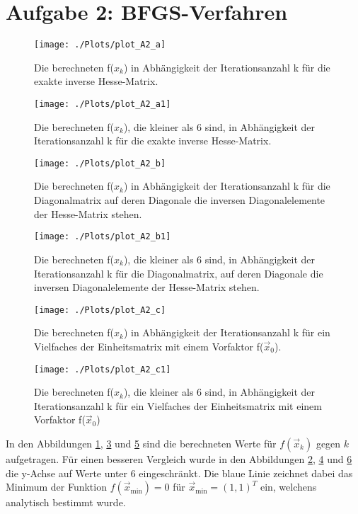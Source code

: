 \section*{Aufgabe 2: BFGS-Verfahren }


  \begin{figure}
    \centering
    \texttt{[image: ./Plots/plot\_A2\_a]}
    \caption{Die berechneten f($x_k$) in Abhängigkeit der Iterationsanzahl k für die  exakte inverse Hesse-Matrix.}
    \label{fig:A2a1}
  \end{figure}
  \begin{figure}
    \centering
    \texttt{[image: ./Plots/plot\_A2\_a1]}
    \caption{Die berechneten f($x_k$), die kleiner als 6 sind, in Abhängigkeit der Iterationsanzahl k für die  exakte inverse Hesse-Matrix.}
    \label{fig:A2a2}
  \end{figure}
  \begin{figure}
    \centering
    \texttt{[image: ./Plots/plot\_A2\_b]}
    \caption{Die berechneten f($x_k$) in Abhängigkeit der Iterationsanzahl k für die Diagonalmatrix auf deren Diagonale die inversen Diagonalelemente der Hesse-Matrix stehen.}
    \label{fig:A2b1}
  \end{figure}
  \begin{figure}
    \centering
    \texttt{[image: ./Plots/plot\_A2\_b1]}
    \caption{Die berechneten f($x_k$), die kleiner als 6 sind, in Abhängigkeit der Iterationsanzahl k für die Diagonalmatrix, auf deren Diagonale die inversen Diagonalelemente der Hesse-Matrix stehen.}
    \label{fig:A2b2}
  \end{figure}
  \begin{figure}
    \centering
    \texttt{[image: ./Plots/plot\_A2\_c]}
    \caption{Die berechneten f($x_k$) in Abhängigkeit der Iterationsanzahl k für ein Vielfaches der Einheitsmatrix mit einem Vorfaktor f($\vec{x}_0$).}
    \label{fig:A2c1}
  \end{figure}
  \begin{figure}
    \centering
    \texttt{[image: ./Plots/plot\_A2\_c1]}
    \caption{Die berechneten f($x_k$), die kleiner als 6 sind, in Abhängigkeit der Iterationsanzahl k für ein Vielfaches der Einheitsmatrix mit einem Vorfaktor f($\vec{x}_0$)}
    \label{fig:A2c2}
  \end{figure}

  In den Abbildungen \ref{fig:A2a1}, \ref{fig:A2b1} und \ref{fig:A2c1} sind die berechneten Werte für $f(\vec{x}_k)$ gegen $k$ aufgetragen. Für einen
  besseren Vergleich wurde in den Abbildungen \ref{fig:A2a2}, \ref{fig:A2b2} und \ref{fig:A2c2} die y-Achse auf Werte unter 6 eingeschränkt. Die blaue
  Linie zeichnet dabei das Minimum der Funktion $f(\vec{x}_\text{min})=0$ für $\vec{x}_\text{min}=(1,1)^T$ ein, welchens analytisch bestimmt wurde.

